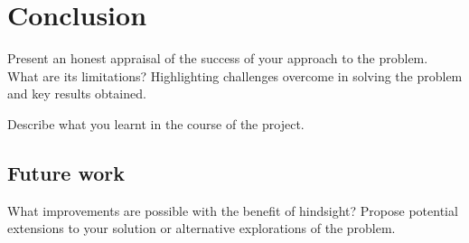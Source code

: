 \chapter{Conclusion}

Present an honest appraisal of the success of your approach to the problem. What are its limitations? Highlighting challenges overcome in solving the problem and key results obtained. 

Describe what you learnt in the course of the project.  

\section{Future work}

What improvements are possible with the benefit of hindsight? Propose potential extensions to your solution or alternative explorations of the problem.
